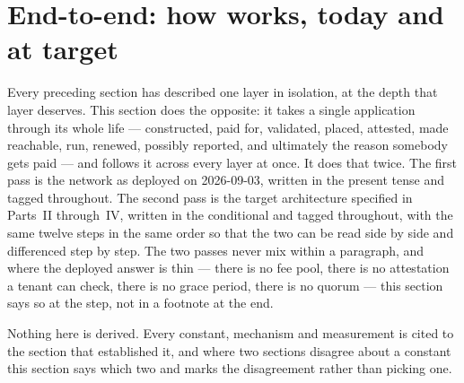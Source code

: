 \section{End-to-end: how \Flux works, today and at target}
\label{sec:end-to-end}

Every preceding section has described one layer in isolation, at the depth that layer deserves. This
section does the opposite: it takes a single application through its whole life --- constructed,
paid for, validated, placed, attested, made reachable, run, renewed, possibly reported, and
ultimately the reason somebody gets paid --- and follows it across every layer at once. It does that
twice. The first pass is the network as deployed on 2026-09-03, written in the present tense
and tagged \shipped throughout. The second pass is the target architecture specified in Parts~II
through~IV, written in the conditional and tagged \planned throughout, with the same twelve steps in
the same order so that the two can be read side by side and differenced step by step. The two passes
never mix within a paragraph, and where the deployed answer is thin --- there is no fee pool, there
is no attestation a tenant can check, there is no grace period, there is no quorum --- this section
says so at the step, not in a footnote at the end.

Nothing here is derived. Every constant, mechanism and measurement is cited to the section that
established it, and where two sections disagree about a constant this section says which two and
marks the disagreement rather than picking one.

